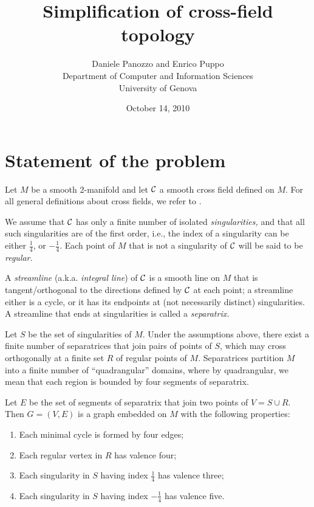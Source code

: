 \documentclass[11pt,a4paper]{article}
\begin{document}
\title{Simplification of cross-field topology}

\author
     {Daniele Panozzo and Enrico Puppo\\
        Department of Computer and Information Sciences\\
      University of Genova
   }

\date{October 14, 2010}

\maketitle










\section{Statement of the problem}
\label{sec:statement}

Let $M$ be a smooth 2-manifold and let $\cal C$ a smooth cross field defined on $M$.
For all general definitions about cross fields, we refer to \cite{RayValLiLev08}.

We assume that $\cal C$ has only a finite number of isolated {\em singularities,} and that all such singularities are of the first order, i.e., the index of a singularity can be either $\frac{1}{4}$, or $-\frac{1}{4}$.
Each point of $M$ that is not a singularity of $\cal C$ will be said to be \emph{regular.}

A {\em streamline} (a.k.a. {\em integral line}) of $\cal C$ is a smooth line on $M$ that is tangent/orthogonal to the directions defined by $\cal C$ at each point;
a streamline either is a cycle, or it has its endpoints at (not necessarily distinct) singularities.
A streamline that ends at singularities is called a \emph{separatrix.}

Let $S$ be the set of singularities of $M$.  
Under the assumptions above, there exist a finite number of separatrices that join pairs of points of $S$, which may cross orthogonally at a finite set $R$ of regular points of $M$.
Separatrices partition $M$ into a finite number of ``quadrangular'' domains, where  by quadrangular, we mean that each region is bounded by four segments of separatrix. 

Let $E$ be the set of segments of separatrix that join two points of $V=S\cup R$. 
Then $G=(V,E)$ is a graph embedded on $M$ with the following properties:
\begin{enumerate}
\item Each minimal cycle is formed by four edges;
\item Each regular vertex in $R$ has valence four;
\item Each singularity in $S$ having index $\frac{1}{4}$ has valence three;
\item Each singularity in $S$ having index $-\frac{1}{4}$ has valence five.
\end{enumerate}
\end{document}
